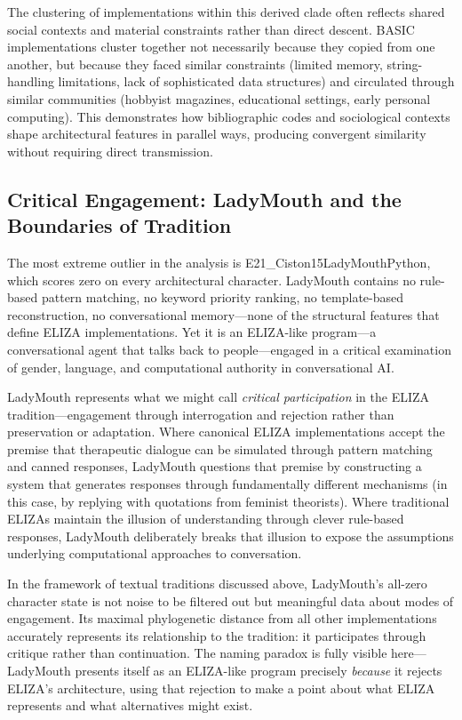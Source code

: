 \documentclass{article}
\begin{document}
The clustering of implementations within this derived clade often reflects shared social contexts and material constraints rather than direct descent. BASIC implementations cluster together not necessarily because they copied from one another, but because they faced similar constraints (limited memory, string-handling limitations, lack of sophisticated data structures) and circulated through similar communities (hobbyist magazines, educational settings, early personal computing). This demonstrates how bibliographic codes and sociological contexts shape architectural features in parallel ways, producing convergent similarity without requiring direct transmission.

\subsection{Critical Engagement: LadyMouth and the Boundaries of Tradition}

The most extreme outlier in the analysis is E21\_Ciston15LadyMouthPython, which scores zero on every architectural character. LadyMouth contains no rule-based pattern matching, no keyword priority ranking, no template-based reconstruction, no conversational memory—none of the structural features that define ELIZA implementations. Yet it is an ELIZA-like program---a conversational agent that talks back to people---engaged in a critical examination of gender, language, and computational authority in conversational AI.

LadyMouth represents what we might call \emph{critical participation} in the ELIZA tradition—engagement through interrogation and rejection rather than preservation or adaptation. Where canonical ELIZA implementations accept the premise that therapeutic dialogue can be simulated through pattern matching and canned responses, LadyMouth questions that premise by constructing a system that generates responses through fundamentally different mechanisms (in this case, by replying with quotations from feminist theorists). Where traditional ELIZAs maintain the illusion of understanding through clever rule-based responses, LadyMouth deliberately breaks that illusion to expose the assumptions underlying computational approaches to conversation.

In the framework of textual traditions discussed above, LadyMouth's all-zero character state is not noise to be filtered out but meaningful data about modes of engagement. Its maximal phylogenetic distance from all other implementations accurately represents its relationship to the tradition: it participates through critique rather than continuation. The naming paradox is fully visible here—LadyMouth presents itself as an ELIZA-like program precisely \emph{because} it rejects ELIZA's architecture, using that rejection to make a point about what ELIZA represents and what alternatives might exist.
\end{document}
